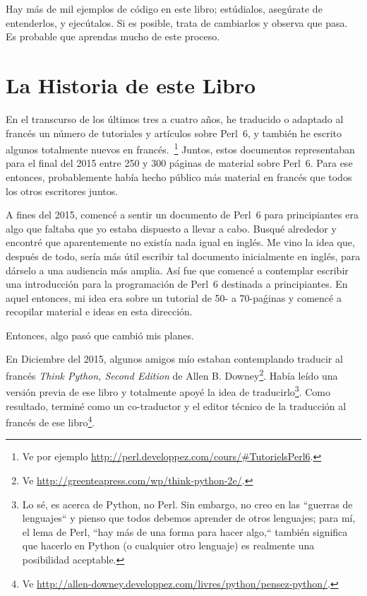 Hay más de mil ejemplos de código en este libro;
estúdialos, asegúrate de entenderlos, y ejecútalos. Si es posible,
trata de cambiarlos y observa que pasa. Es probable que aprendas mucho
de este proceso.


\section*{La Historia de este Libro}

En el transcurso de los últimos tres a cuatro años,
he traducido o adaptado al francés un número de tutoriales
y artículos sobre Perl~6, y también he escrito algunos totalmente
nuevos en francés.~\footnote{Ve por ejemplo 
\url{http://perl.developpez.com/cours/\#TutorielsPerl6}.}
Juntos, estos documentos representaban para el final del 2015
entre 250 y 300 páginas de material sobre Perl~6. Para ese entonces,
probablemente había hecho público más material en francés que todos
los otros escritores juntos.

A fines del 2015, comencé a sentir un documento de Perl~6 para principiantes
era algo que faltaba que yo estaba dispuesto a llevar a cabo. Busqué alrededor
y encontré que aparentemente no existía nada igual en inglés. 
Me vino la idea que, después de todo, sería más útil escribir tal documento inicialmente
en inglés, para dárselo a una audiencia más amplia. Así fue que comencé a 
contemplar escribir una introducción para la programación de Perl~6 destinada
a principiantes. En aquel entonces, mi idea era sobre un tutorial de 50- a 70-paǵinas
y comencé a recopilar material e ideas en esta dirección.

Entonces, algo pasó que cambió mis planes.

En Diciembre del 2015, algunos amigos mío estaban contemplando
traducir al francés \emph{Think Python, Second Edition} de Allen B. Downey\footnote{Ve \url{http://greenteapress.com/wp/think-python-2e/}.}. 
Había leído una versión previa de ese libro y totalmente apoyé la idea
de traducirlo\footnote{Lo sé, es acerca de Python, no Perl.
Sin embargo, no creo en las ``guerras de lenguajes`` y pienso que todos
debemos aprender de otros lenguajes; para mí, el lema de Perl, ``hay más de 
una forma para hacer algo,`` también significa que hacerlo en Python (o cualquier
otro lenguaje) es realmente una posibilidad aceptable.}. Como resultado,
terminé como un co-traductor y el editor técnico de la traducción al francés de ese
libro\footnote{Ve
	\url{http://allen-downey.developpez.com/livres/python/pensez-python/}.}.

